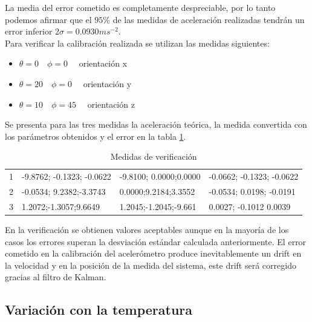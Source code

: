 \documentclass[main]{subfiles}
\begin{document}
La media del error cometido es completamente despreciable, por lo tanto podemos afirmar que el $95\% $ de las medidas de aceleración realizadas tendrán un error inferior $2\sigma=0.0930ms^{-2}$.\\
 
Para verificar la calibración realizada se utilizan las medidas siguientes:
\begin{itemize}
\item $\theta = 0 \quad \phi = 0 \quad$ orientación x
\item $\theta = 20 \quad \phi = 0 \quad$ orientación y
\item $\theta = 10 \quad \phi = 45 \quad$ orientación z
\end{itemize}

Se presenta para las tres medidas la aceleración teórica, la medida convertida con los parámetros obtenidos y el error en la tabla \ref{tab:diff}. 

\begin{table}[H]
\centering
\begin{tabular}{|p{100pt}|p{100pt}|p{100pt}|p{100pt}|}
\hline
\cellcolor[gray]{0.8}{Medida} & \cellcolor[gray]{0.8}{Aceleración Medida ($ms^{-2}$)}&\cellcolor[gray]{0.8}{Aceleración teórica($m^{-2}$)}& \cellcolor[gray]{0.8}{Error($ms^{-2}$)} \\
\hline
1 &  -9.8762; -0.1323; -0.0622   &  -9.8100; 0.0000;0.0000     & -0.0662; -0.1323; -0.0622\\
\hline
2 & -0.0534; 9.2382;-3.3743       &  0.0000;9.2184;3.3552     & -0.0534; 0.0198; -0.0191\\
\hline
3 & 1.2072;-1.3057;9.6649       &  1.2045;-1.2045;-9.661   & 0.0027; -0.1012 0.0039\\
\hline
\end{tabular}
\caption{Medidas de verificación}
\label{tab:diff}
\end{table}

En la verificaci\'on se obtienen valores aceptables aunque en la mayor\'ia de los casos los errores superan la desviaci\'on  est\'andar calculada anteriormente. El error cometido en la calibraci\'on del aceler\'ometro produce inevitablemente un drift en la velocidad y en la posici\'on de la medida del sistema, este drift ser\'a corregido gracias al filtro de Kalman.


\subsection{Variación con la temperatura}
\end{document}
